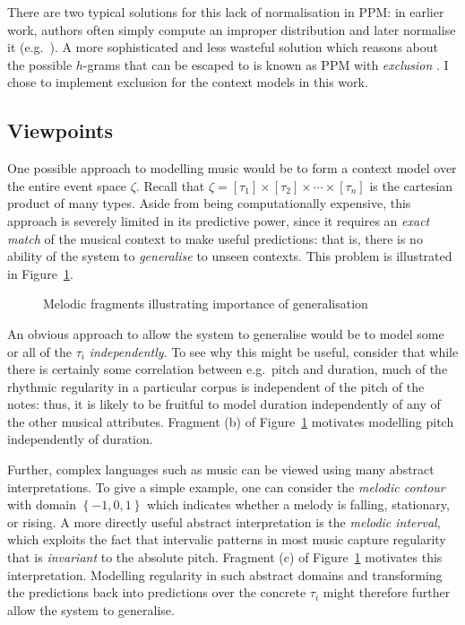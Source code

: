 \documentclass[12pt,a4paper,twoside,openright]{report}
\newcommand{\set}[1]{ \left\{ #1 \right\} }
\begin{document}
There are two typical solutions for this lack of normalisation in PPM: in
earlier work, authors often simply compute an improper distribution and later
normalise it (e.g.\ \cite{conklin1990prediction}). A more sophisticated and less
wasteful solution which reasons about the possible $h$-grams that can be escaped
to is known as PPM with \emph{exclusion} \cite{pearce2004improved}. I chose to
implement exclusion for the context models in this work.

\subsection{Viewpoints}\label{sec:mvs-formalism}

One possible approach to modelling music would be to form a context model over
the entire event space $\zeta$.  Recall that $\zeta = [\tau_1] \times [\tau_2]
\times \cdots \times [\tau_n]$ is the cartesian product of many types. Aside
from being computationally expensive, this approach is severely limited in its
predictive power, since it requires an \emph{exact match} of the musical context
to make useful predictions: that is, there is no ability of the system to
\emph{generalise} to unseen contexts. This problem is illustrated in
Figure~\ref{fig:generalise}.

\begin{figure}[H]
\centering

\caption{Melodic fragments illustrating importance of generalisation}
\label{fig:generalise}
\end{figure}

An obvious approach to allow the system to generalise would be to model some or
all of the $\tau_i$ \emph{independently}. To see why this might be useful,
consider that while there is certainly some correlation between e.g.\ pitch and
duration, much of the rhythmic regularity in a particular corpus is independent
of the pitch of the notes: thus, it is likely to be fruitful to model duration
independently of any of the other musical attributes. Fragment (b) of
Figure~\ref{fig:generalise} motivates modelling pitch
independently of duration.

Further, complex languages such as music can be viewed using many abstract
interpretations. To give a simple example, one can consider the \emph{melodic
contour} with domain $\set{-1,0,1}$ which indicates whether a melody is falling,
stationary, or rising. A more directly useful abstract interpretation is the
\emph{melodic interval}, which exploits the fact that intervalic patterns in
most music capture regularity that is \emph{invariant} to the absolute pitch.
Fragment (c) of Figure~\ref{fig:generalise} motivates this interpretation.
Modelling regularity in such abstract domains and transforming the predictions
back into predictions over the concrete $\tau_i$ might therefore further allow
the system to generalise.  
\end{document}

